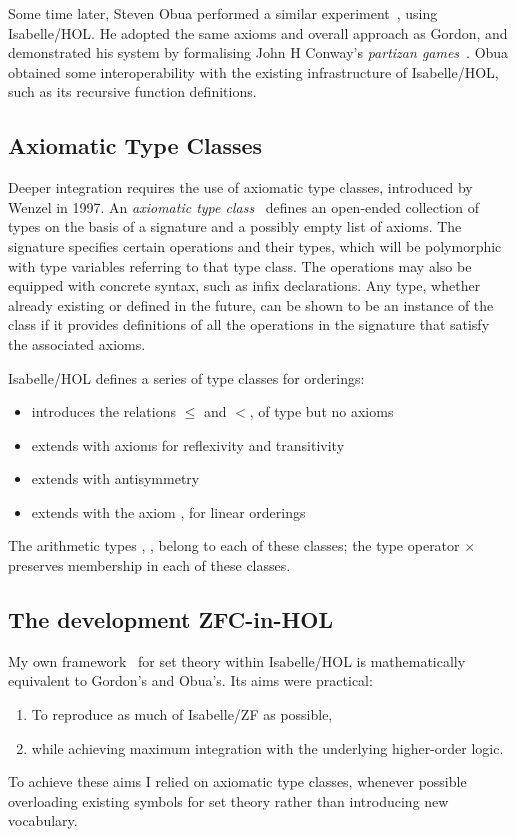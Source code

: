 \documentclass[runningheads]{llncs}
\begin{document}
Some time later, Steven Obua performed a similar experiment~\cite{obua-partizan-games}, using Isabelle/HOL\@.
He adopted the same axioms and overall approach as Gordon, and demonstrated his system by formalising John H Conway's \textit{partizan games}~\cite{schleicher-conways-games}.
Obua obtained some interoperability with the existing infrastructure of Isabelle/HOL, such as its recursive function definitions. 

\subsection{Axiomatic Type Classes}

Deeper integration requires the use of axiomatic type classes, introduced by Wenzel in 1997.
An \textit{axiomatic type class}~\cite{wenzel-type} defines an open-ended collection of types on the basis of a signature and a possibly empty list of axioms. The signature specifies certain operations and their types, which will be polymorphic with type variables referring to that type class.
The operations may also be equipped with concrete syntax, such as infix declarations.
Any type, whether already existing or defined in the future, can be shown to be an instance of the class if it provides definitions of all the operations in the signature that satisfy the associated axioms.

Isabelle/HOL defines a series of type classes for orderings:
\begin{itemize}
	\item {} introduces the relations $\le$ and $<$, of type  but no axioms
	\item {} extends  with axioms for reflexivity and transitivity
	\item {} extends  with antisymmetry
	\item {} extends  with the axiom , for linear orderings
\end{itemize}
The arithmetic types , ,  belong to each of these classes; the type operator $\times$ preserves membership in each of these classes.

\subsection{The development ZFC-in-HOL}

My own framework~\cite{ZFC_in_HOL-AFP} for set theory within Isabelle/HOL is mathematically equivalent to Gordon's and Obua's.
Its aims were practical:
\begin{enumerate}
	\item To reproduce as much of Isabelle/ZF as possible,
	\item while achieving maximum integration with the underlying higher-order logic.
\end{enumerate}
To achieve these aims I relied on axiomatic type classes, whenever possible overloading existing symbols for set theory rather than introducing new vocabulary.
\end{document}
